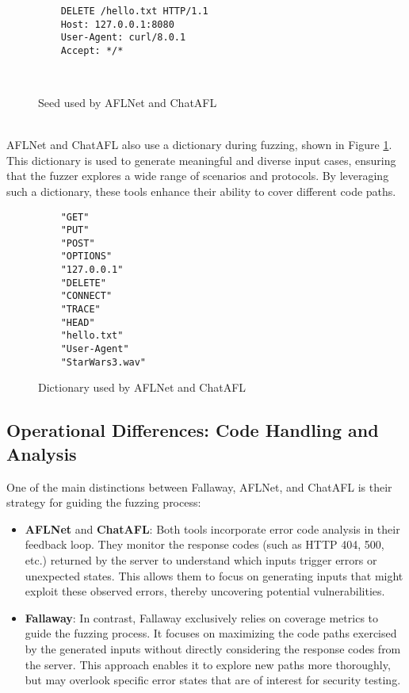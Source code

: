 \begin{figure}[H]
    \centering
    \begin{adjustbox}{valign=t}
    \begin{lstlisting}
    DELETE /hello.txt HTTP/1.1
    Host: 127.0.0.1:8080
    User-Agent: curl/8.0.1
    Accept: */*

    
    \end{lstlisting}
    \end{adjustbox}
    \caption{Seed used by AFLNet and ChatAFL}
\end{figure}
\phantom{}\\
AFLNet and ChatAFL also use a dictionary during fuzzing, shown in Figure \ref{fig:dictionary}. This dictionary is used to generate meaningful and diverse input cases, ensuring that the fuzzer explores a wide range of scenarios and protocols. By leveraging such a dictionary, these tools enhance their ability to cover different code paths.
\begin{figure}[H]
    \centering
    \begin{adjustbox}{valign=t}
    \begin{lstlisting}
    "GET"
    "PUT"
    "POST"
    "OPTIONS"
    "127.0.0.1"
    "DELETE"
    "CONNECT"
    "TRACE"
    "HEAD"
    "hello.txt"
    "User-Agent"
    "StarWars3.wav"
    \end{lstlisting}
    \end{adjustbox}
    \caption{Dictionary used by AFLNet and ChatAFL}
    \label{fig:dictionary}
\end{figure}

\subsection{Operational Differences: Code Handling and Analysis}

One of the main distinctions between Fallaway, AFLNet, and ChatAFL is their strategy for guiding the fuzzing process:

\begin{itemize}
    \item \textbf{AFLNet} and \textbf{ChatAFL}: Both tools incorporate error code analysis in their feedback loop. They monitor the response codes (such as HTTP 404, 500, etc.) returned by the server to understand which inputs trigger errors or unexpected states. This allows them to focus on generating inputs that might exploit these observed errors, thereby uncovering potential vulnerabilities.
    \item \textbf{Fallaway}: In contrast, Fallaway exclusively relies on coverage metrics to guide the fuzzing process. It focuses on maximizing the code paths exercised by the generated inputs without directly considering the response codes from the server. This approach enables it to explore new paths more thoroughly, but may overlook specific error states that are of interest for security testing.
\end{itemize}


